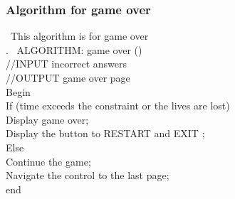 \subsubsection{Algorithm for  game over}

\ttfamily\ \hspace{1cm}This algorithm is for game over\\
 \cite{DBLP:journals/ivc/KadyrovP03}.
\rmfamily\ ALGORITHM: game over ()\\
//INPUT incorrect answers\\
//OUTPUT game over page\\
Begin\\
If (time exceeds the constraint or the lives are lost)\\
Display game over;\\
Display the button to RESTART and EXIT ;\\
Else\\
Continue the game;\\
Navigate the control to the last page;\\
end
\rmfamily
